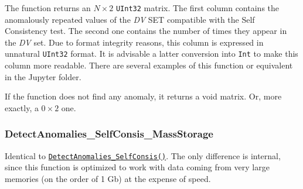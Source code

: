 \begin{itemize}
\begin{itemize}
	\end{itemize}
	
	The function returns an \(N\times 2\) \texttt{UInt32} matrix. The first column contains the anomalously repeated values of the \textit{DV} SET compatible with the Self Consistency test. The second one contains the number of times they appear in the \textit{DV} set. Due to format integrity reasons, this column is expressed in unnatural \texttt{UInt32} format. It is advisable a latter conversion into \texttt{Int} to make this column more readable. There are several examples of this function or equivalent in the Jupyter folder.
	
	If the function does not find any anomaly, it returns a void matrix.  Or, more exactly, a \(0\times 2\) one.
\end{itemize}
%
\subsubsection*{DetectAnomalies\_SelfConsis\_MassStorage}\label{Fun:DetectAnomaliesSelfConsis_MassStorage}
%
Identical to \hyperref[Fun:DetectAnomaliesSelfConsis]{\texttt{DetectAnomalies\_SelfConsis()}}. The only difference is internal, since this function is optimized to work with data coming from very large memories (on the order of 1 Gb) at the expense of speed. 
%
